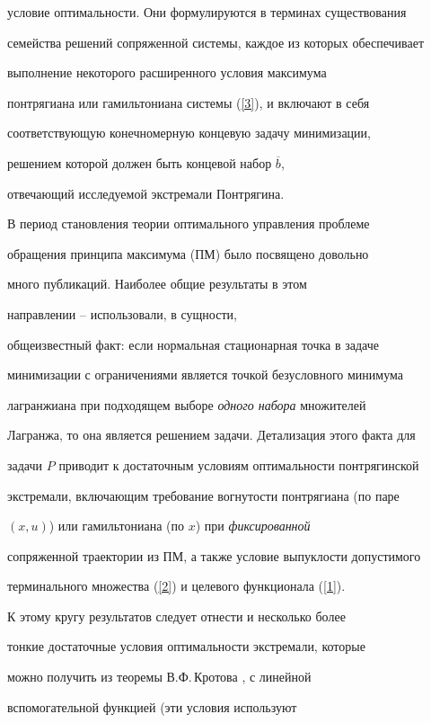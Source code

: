 условие оптимальности. Они формулируются в терминах существования


семейства решений сопряженной системы, каждое из которых обеспечивает


выполнение некоторого расширенного условия максимума


понтрягиана или гамильтониана системы (\ref{3}), и включают в себя


соответствующую конечномерную концевую задачу минимизации,


решением которой должен быть концевой набор $\overline{b}$,


отвечающий исследуемой экстремали Понтрягина.





В период становления теории оптимального управления проблеме


обращения принципа максимума (ПМ) было посвящено довольно


много публикаций. Наиболее общие результаты в этом


направлении \cite{2}--\cite{6} использовали, в сущности,


общеизвестный факт: если нормальная стационарная точка в задаче


минимизации с ограничениями является точкой безусловного минимума


лагранжиана при подходящем выборе {\em одного набора} множителей


Лагранжа, то она является решением задачи. Детализация этого факта для


задачи $P$ приводит к достаточным условиям оптимальности понтрягинской


экстремали, включающим требование вогнутости понтрягиана (по паре


$(x,u)$) или гамильтониана (по $x$) при {\em фиксированной}


сопряженной траектории из ПМ, а также условие выпуклости допустимого


терминального множества (\ref{2}) и целевого функционала (\ref{1}).





К этому кругу результатов следует отнести и несколько более


тонкие достаточные условия оптимальности экстремали, которые


можно получить из теоремы В.Ф.\,Кротова \cite{7}, \cite{8} с линейной


вспомогательной функцией (эти условия используют


